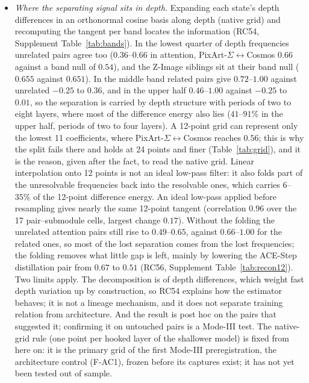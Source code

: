 \documentclass[11pt]{article}
\begin{document}
\begin{itemize}
 \item \emph{Where the separating signal sits in depth.} Expanding each state's depth differences in an orthonormal cosine basis along depth (native grid) and recomputing the tangent per band locates the information (RC54, Supplement Table~\ref{tab:bands}). In the lowest quarter of depth frequencies unrelated pairs agree too ($0.36$--$0.66$ in attention, PixArt-$\Sigma$$\leftrightarrow$Cosmos $0.66$ against a band null of $0.54$), and the Z-Image siblings sit at their band null ($0.655$ against $0.651$). In the middle band related pairs give $0.72$--$1.00$ against unrelated $-0.25$ to $0.36$, and in the upper half $0.46$--$1.00$ against $-0.25$ to $0.01$, so the separation is carried by depth structure with periods of two to eight layers, where most of the difference energy also lies ($41$--$91\%$ in the upper half, periods of two to four layers). A 12-point grid can represent only the lowest 11 coefficients, where PixArt-$\Sigma$$\leftrightarrow$Cosmos reaches $0.56$; this is why the split fails there and holds at 24 points and finer (Table~\ref{tab:grid}), and it is the reason, given after the fact, to read the native grid. Linear interpolation onto 12 points is not an ideal low-pass filter: it also folds part of the unresolvable frequencies back into the resolvable ones, which carries $6$--$35\%$ of the 12-point difference energy. An ideal low-pass applied before resampling gives nearly the same 12-point tangent (correlation $0.96$ over the 17 pair--submodule cells, largest change $0.17$). Without the folding the unrelated attention pairs still rise to $0.49$--$0.65$, against $0.66$--$1.00$ for the related ones, so most of the lost separation comes from the lost frequencies; the folding removes what little gap is left, mainly by lowering the ACE-Step distillation pair from $0.67$ to $0.51$ (RC56, Supplement Table~\ref{tab:recon12}). Two limits apply. The decomposition is of depth differences, which weight fast depth variation up by construction, so RC54 explains how the estimator behaves; it is not a lineage mechanism, and it does not separate training relation from architecture. And the result is post hoc on the pairs that suggested it; confirming it on untouched pairs is a Mode-III test. The native-grid rule (one point per hooked layer of the shallower model) is fixed from here on: it is the primary grid of the first Mode-III preregistration, the architecture control (F-AC1), frozen before its captures exist; it has not yet been tested out of sample.

\end{itemize}
\end{document}
